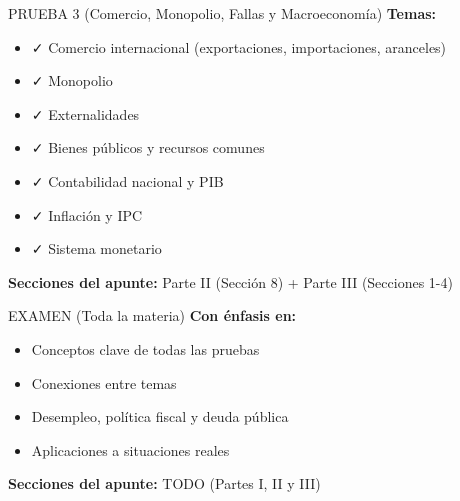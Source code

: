 \documentclass[11pt,a4paper]{article}
\begin{document}
\vspace{0.7cm}

\begin{prueba}{PRUEBA 3 (Comercio, Monopolio, Fallas y Macroeconomía)}
\textbf{Temas:}
\begin{itemize}
    \item ✓ Comercio internacional (exportaciones, importaciones, aranceles)
    \item ✓ Monopolio
    \item ✓ Externalidades
    \item ✓ Bienes públicos y recursos comunes
    \item ✓ Contabilidad nacional y PIB
    \item ✓ Inflación y IPC
    \item ✓ Sistema monetario
\end{itemize}
\textbf{Secciones del apunte:} Parte II (Sección 8) + Parte III (Secciones 1-4)
\end{prueba}

\vspace{0.7cm}

\begin{prueba}{EXAMEN (Toda la materia)}
\textbf{Con énfasis en:}
\begin{itemize}
    \item Conceptos clave de todas las pruebas
    \item Conexiones entre temas
    \item Desempleo, política fiscal y deuda pública
    \item Aplicaciones a situaciones reales
\end{itemize}
\textbf{Secciones del apunte:} TODO (Partes I, II y III)
\end{prueba}

\newpage
\end{document}
